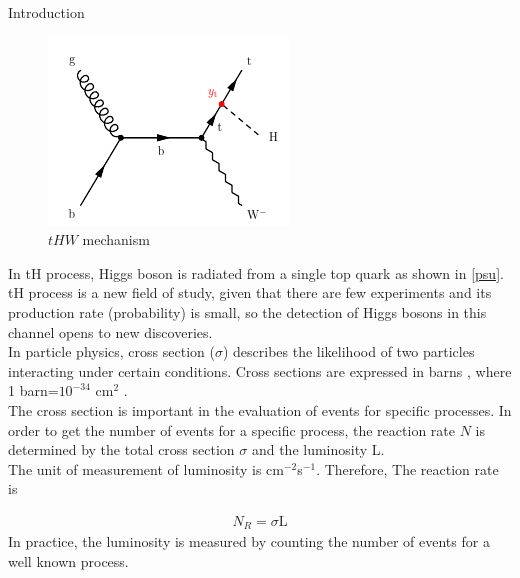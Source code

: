 \begin{chapter}{Introduction}
\begin{figure}[htbp]
\centering
\includegraphics[scale=0.7]{Chapter1/thw.png}
\caption{$tHW$ mechanism}
\label{thw}
\end{figure}

In tH process, Higgs boson is radiated from a single top quark as shown in \ref{psu}. tH process is a new field of study, given that there are few experiments and its production rate (probability) is small, so the detection of Higgs bosons in this channel opens to new discoveries.
\\

In particle physics, cross section ($\sigma$) describes the likelihood of two particles interacting under certain conditions.
 Cross sections are expressed in barns , where 1 barn=$10^{-34}$ cm$^{2}$ .
\\
The cross section is important in the evaluation of events for specific processes. In order to get the number of events for a specific process,  the reaction rate $N$ is determined by the total cross section $\sigma$ and the luminosity L.\\
The unit of measurement of luminosity is  cm$^{-2}$s$^{-1}$.  Therefore, The reaction rate is 

\begin{align} \label{nr}
N_R=\sigma \text{L}
\end{align}
In practice, the luminosity is measured by counting the number of events for a well known process.


\end{chapter}
